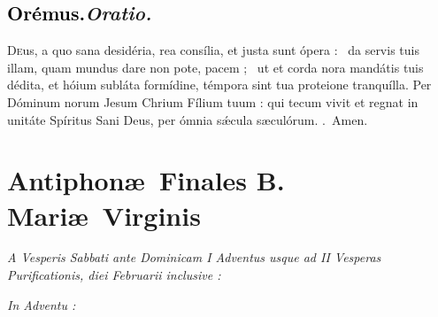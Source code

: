 \documentclass[12pt]{article} %
\newenvironment{rubric}{\vspace{2 mm}\color{benred8} \itshape \leftskip 0in \setlength{\parindent}{0.25in}}{\vspace{2 mm}}
\newenvironment{response}{\leftskip 0in \setlength{\parindent}{0in}}{\vspace{2 mm}}
\let\oldgresixstar\gresixstar
\renewcommand{\gresixstar}{\textcolor{benred8}{\oldgresixstar}}
\let\oldgredagger\gredagger
\renewcommand{\gredagger}{\textcolor{benred8}{\oldgredagger}}
\let\oldRbar\Rbar
\renewcommand{\Rbar}{\textcolor{benred8}{\oldRbar .}}
\def\capitulumSpace{\hspace{20 mm}}
\begin{document}
\subsection*{\textcolor{black}{Or\'{e}mus.}\capitulumSpace \emph{Oratio.}}

\begin{response}\lettrine{D}{e}us, a quo sana desid\'{e}ria, rea cons\'{i}lia, et justa sunt \'{o}pera : \gredagger\ da servis tuis illam, quam mundus dare non pote, pacem ; \gresixstar\ ut et corda nora mand\'{a}tis tuis d\'{e}dita, et h\'{o}ium subl\'{a}ta form\'{i}dine, t\'{e}mpora sint tua proteione tranqu\'{i}lla. Per D\'{o}minum norum Jesum Chrium F\'{i}lium tuum : qui tecum vivit et regnat in unit\'{a}te Sp\'{i}ritus Sani Deus, per \'{o}mnia s\'{\ae}cula s\ae cul\'{o}rum. \Rbar\ Amen.

\end{response}

\newpage


\section*{Antiphon\ae\ Finales B. Mari\ae\ Virginis}
\label{sec:AntBMV}

\thispagestyle{plain}


\begin{rubric}
\hspace*{25pt}A Vesperis Sabbati ante Dominicam I Adventus usque ad II Vesperas Purificationis, diei Februarii inclusive :

\end{rubric}


\gresetfirstlineaboveinitial{\small \textsc{ \textbf{\textcolor{benred8}{V}}}}{\small \textsc{ \textbf{\textcolor{benred8}{V}}}}

\vspace{2mm}

\begin{rubric}
In Adventu :

\end{rubric}
\end{document}
